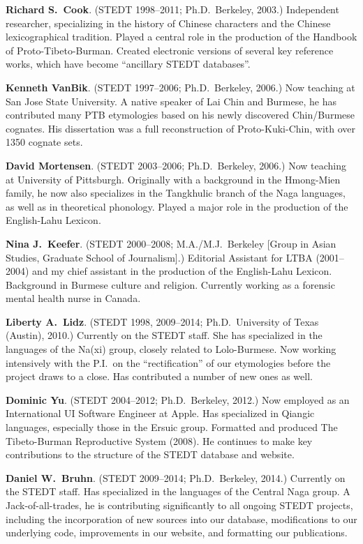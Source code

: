\textbf{Richard S.\ Cook}. (STEDT 1998–2011; Ph.D.\ Berkeley, 2003.) Independent researcher, specializing in the history of Chinese characters and the Chinese lexicographical tradition. Played a central role in the production of the Handbook of Proto-Tibeto-Burman. Created electronic versions of several key reference works, which have become “ancillary STEDT databases”.

\textbf{Kenneth VanBik}. (STEDT 1997–2006; Ph.D.\ Berkeley, 2006.) Now teaching at San Jose State University. A native speaker of Lai Chin and Burmese, he has contributed many PTB etymologies based on his newly discovered Chin/Burmese cognates. His dissertation was a full reconstruction of Proto-Kuki-Chin, with over 1350 cognate sets.

\textbf{David Mortensen}. (STEDT 2003–2006; Ph.D.\ Berkeley, 2006.) Now teaching at University of Pittsburgh. Originally with a background in the Hmong-Mien family, he now also specializes in the Tangkhulic branch of the Naga languages, as well as in theoretical phonology. Played a major role in the production of the English-Lahu Lexicon.

\textbf{Nina J.\ Keefer}. (STEDT 2000–2008; M.A./M.J.\ Berkeley [Group in Asian Studies, Graduate School of Journalism].) Editorial Assistant for LTBA (2001–2004) and my chief assistant in the production of the English-Lahu Lexicon. Background in Burmese culture and religion. Currently working as a forensic mental health nurse in Canada.

\textbf{Liberty A.\ Lidz}. (STEDT 1998, 2009–2014; Ph.D.\ University of Texas (Austin), 2010.) Currently on the STEDT staff. She has specialized in the languages of the Na(xi) group, closely related to Lolo-Burmese. Now working intensively with the P.I.\ on the “rectification” of our etymologies before the project draws to a close. Has contributed a number of new ones as well.

\textbf{Dominic Yu}. (STEDT 2004–2012; Ph.D.\ Berkeley, 2012.) Now employed as an International UI Software Engineer at Apple. Has specialized in Qiangic languages, especially those in the Ersuic group. Formatted and produced The Tibeto-Burman Reproductive System (2008). He continues to make key contributions to the structure of the STEDT database and website.

\textbf{Daniel W.\ Bruhn}. (STEDT 2009–2014; Ph.D.\ Berkeley, 2014.) Currently on the STEDT staff. Has specialized in the languages of the Central Naga group. A Jack-of-all-trades, he is contributing significantly to all ongoing STEDT projects, including the incorporation of new sources into our database, modifications to our underlying code, improvements in our website, and formatting our publications.

